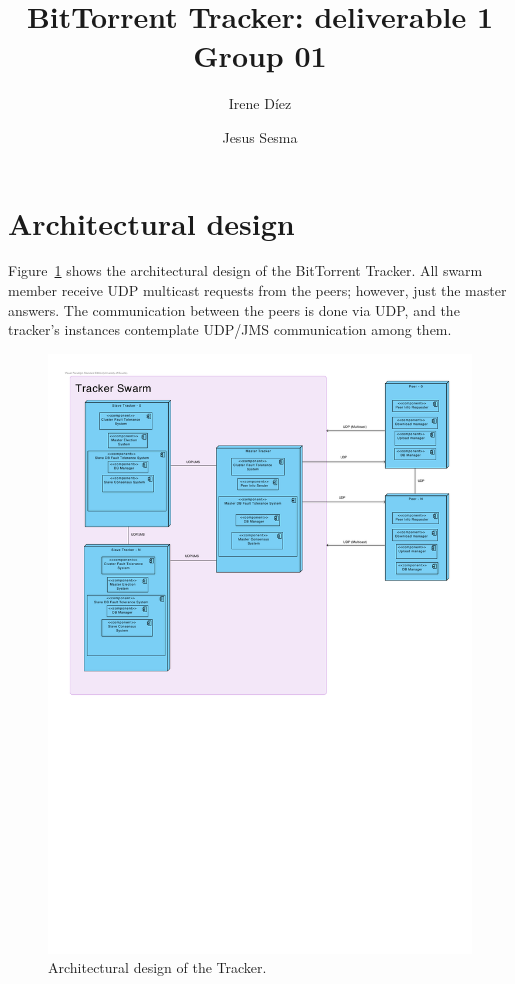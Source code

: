 \documentclass[twoside,a4paper,10pt]{article}
\title{BitTorrent Tracker: deliverable 1\\
  Group 01}
\author{Irene Díez \and Jesus Sesma}
\begin{document}
\date{}
\maketitle


\section{Architectural design}

Figure~\ref{fig:arch} shows the architectural design of the BitTorrent Tracker.
All swarm member receive UDP multicast requests from the peers; however, just
the master answers.
The communication between the peers is done via UDP, and the
tracker's instances contemplate UDP/JMS communication among them.

\begin{figure}[h]
  \centering
  \includegraphics[width=\textwidth]{vp/architectural-design.pdf}
  \caption{\label{fig:arch}Architectural design of the Tracker.}
\end{figure}
\end{document}
